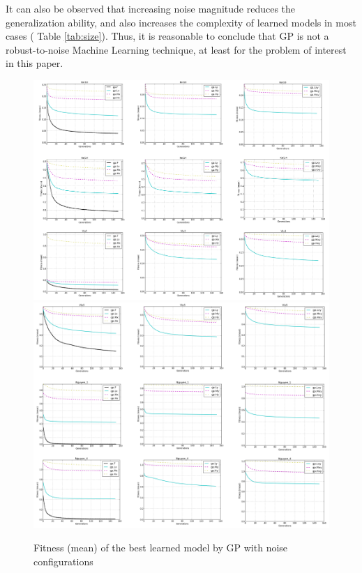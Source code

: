 It can also be observed that increasing noise magnitude reduces the generalization ability, and also increases the complexity of learned models in most cases ( Table \ref{tab:size}). Thus, it is reasonable to conclude that GP is not a robust-to-noise Machine Learning technique, at least for the problem of interest in this paper.
\begin{figure}
  \includegraphics[width=1.0\textwidth]{Figures/Figure4.png}
  \includegraphics[width=1.0\textwidth]{Figures/Figure5.png}
\caption{Fitness (mean) of the best learned model by GP with noise configurations}
\label{fig:Fitness}       %
\end{figure}
